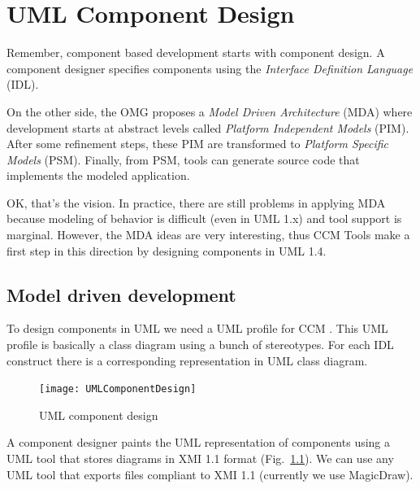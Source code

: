\chapter{UML Component Design}

Remember, component based development starts with component design.
A component designer specifies components using the 
{\it Interface Definition Language} (IDL).

On the other side, the OMG proposes a {\it Model Driven Architecture} (MDA) where
development starts at abstract levels called {\it Platform Independent Models}
(PIM).
After some refinement steps, these PIM are transformed to {\it Platform Specific Models}
(PSM).
Finally, from PSM, tools can generate source code that implements the modeled 
application.

OK, that's the vision. 
In practice, there are still problems in applying MDA because modeling of 
behavior is difficult (even in UML 1.x) and tool support is marginal. 
However, the MDA ideas are very interesting, thus CCM Tools make a first step in this
direction by designing components in UML 1.4.

\section{Model driven development}

To design components in UML we need a UML profile for CCM \cite{UML-CORBA-Profile,UML-CCM-Profile}. 
This UML profile is basically a class diagram using a bunch of stereotypes.
For each IDL construct there is a corresponding representation in UML class diagram.

\begin{figure}[htbp]
    \begin{center}
        \texttt{[image: UMLComponentDesign]}
        \caption{UML component design}
        \label{fig:uml-component-design}
    \end{center}
\end{figure}

A component designer paints the UML representation of components using a UML tool 
that stores diagrams in XMI 1.1 format (Fig.~\ref{fig:uml-component-design}).
We can use any UML tool that exports files compliant to XMI 1.1  (currently 
we use MagicDraw).

